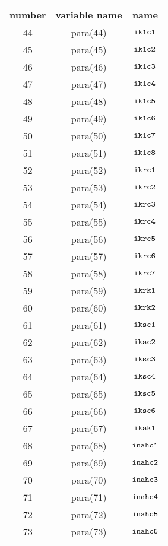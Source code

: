 \documentclass{article}
\begin{document}
\begin{center}
\begin{tabular}{|c|c|c|}
\hline
number & variable name & name \\
\hline
44 & para(44)  & $\mbox{\tt ik1c1}$ \\ 
45 & para(45)  & $\mbox{\tt ik1c2}$ \\ 
46 & para(46)  & $\mbox{\tt ik1c3}$ \\ 
47 & para(47)  & $\mbox{\tt ik1c4}$ \\ 
48 & para(48)  & $\mbox{\tt ik1c5}$ \\ 
49 & para(49)  & $\mbox{\tt ik1c6}$ \\ 
50 & para(50)  & $\mbox{\tt ik1c7}$ \\ 
51 & para(51)  & $\mbox{\tt ik1c8}$ \\ 
52 & para(52)  & $\mbox{\tt ikrc1}$ \\ 
53 & para(53)  & $\mbox{\tt ikrc2}$ \\ 
54 & para(54)  & $\mbox{\tt ikrc3}$ \\ 
55 & para(55)  & $\mbox{\tt ikrc4}$ \\ 
56 & para(56)  & $\mbox{\tt ikrc5}$ \\ 
57 & para(57)  & $\mbox{\tt ikrc6}$ \\ 
58 & para(58)  & $\mbox{\tt ikrc7}$ \\ 
59 & para(59)  & $\mbox{\tt ikrk1}$ \\ 
60 & para(60)  & $\mbox{\tt ikrk2}$ \\ 
61 & para(61)  & $\mbox{\tt iksc1}$ \\ 
62 & para(62)  & $\mbox{\tt iksc2}$ \\ 
63 & para(63)  & $\mbox{\tt iksc3}$ \\ 
64 & para(64)  & $\mbox{\tt iksc4}$ \\ 
65 & para(65)  & $\mbox{\tt iksc5}$ \\ 
66 & para(66)  & $\mbox{\tt iksc6}$ \\ 
67 & para(67)  & $\mbox{\tt iksk1}$ \\ 
68 & para(68)  & $\mbox{\tt inahc1}$ \\ 
69 & para(69)  & $\mbox{\tt inahc2}$ \\ 
70 & para(70)  & $\mbox{\tt inahc3}$ \\ 
71 & para(71)  & $\mbox{\tt inahc4}$ \\ 
72 & para(72)  & $\mbox{\tt inahc5}$ \\ 
73 & para(73)  & $\mbox{\tt inahc6}$ \\ 

\end{tabular}
\end{center}
\end{document}
